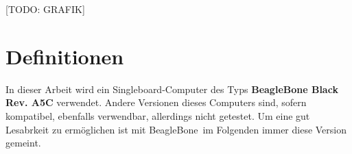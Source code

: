 [TODO: GRAFIK]


\section{Definitionen}
In dieser Arbeit wird ein Singleboard-Computer des Typs \textbf{BeagleBone Black Rev. A5C} verwendet. Andere Versionen dieses Computers sind, sofern kompatibel, ebenfalls verwendbar, allerdings nicht getestet. Um eine gut Lesabrkeit zu ermöglichen ist mit \glqq BeagleBone\grqq ~im Folgenden immer diese Version gemeint.